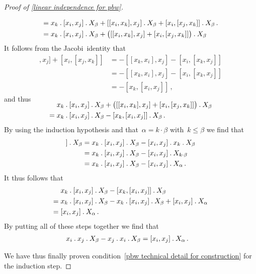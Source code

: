 \begin{proof}[Proof of \cref{linear independence for pbw}]
\begin{casedistinction}
\begin{align*}
				={}&
				x_k \mathbin{.} [x_i, x_j] \mathbin{.} X_\beta
				+ [[x_i, x_k], x_j] \mathbin{.} X_\beta
				+ [x_i, [x_j, x_k]] \mathbin{.} X_\beta \,.
				\\
				={}&
				x_k \mathbin{.} [x_i, x_j] \mathbin{.} X_\beta
				+ \bigl( [[x_i, x_k], x_j] + [x_i, [x_j, x_k]] \bigr) \mathbin{.} X_\beta
			\end{align*}
			It follows from the Jacobi~identity that
			\begin{align*}
				[[x_i, x_k], x_j] + [x_i, [x_j, x_k]]
				&=
				- [[x_k, x_i], x_j] - [x_i, [x_k, x_j]]
				\\
				&=
				- [[x_k, x_i], x_j] - [x_i, [x_k, x_j]]
				\\
				&=
				- [x_k, [x_i, x_j]] \,,
			\end{align*}
			and thus
			\begin{align*}
				\SwapAboveDisplaySkip
				{}&
				x_k \act [x_i, x_j] \act X_\beta
				+ \bigl( [[x_i, x_k], x_j] + [x_i, [x_j, x_k]] \bigr) \act X_\beta
				\\
				={}&
				x_k \act [x_i, x_j] \act X_\beta
				- [x_k, [x_i, x_j] ] \act X_\beta \,.
			\end{align*}
			By using the induction hypothesis and that~$\alpha = k \cdot \beta$ with~$k \leq \beta$ we find that
			\begin{align*}
				[x_k, [x_i, x_j]] \act X_\beta
				&=
				x_k \act [x_i, x_j] \act X_\beta
				- [x_i, x_j] \act x_k \act X_\beta
				\\
				&=
				x_k \act [x_i, x_j] \act X_\beta
				- [x_i, x_j] \act X_{k \cdot \beta}
				\\
				&=
				x_k \act [x_i, x_j] \act X_\beta
				- [x_i, x_j] \act X_{\alpha} \,.
			\end{align*}
			It thus follows that
			\begin{align*}
				{}&
				x_k \mathbin{.} [x_i, x_j] \mathbin{.} X_\beta
				- [x_k, [x_i, x_j] ] \mathbin{.} X_\beta
				\\
				={}&
				x_k \mathbin{.} [x_i, x_j] \mathbin{.} X_\beta
				- x_k \mathbin{.} [x_i, x_j] \mathbin{.} X_\beta
				+ [x_i, x_j] \mathbin{.} X_{\alpha}
				\\
				={}&
				[x_i, x_j] \mathbin{.} X_{\alpha} \,.
			\end{align*}
			By putting all of these steps together we find that
			\begin{align*}
				x_i \mathbin{.} x_j \mathbin{.} X_\beta
				- x_j \mathbin{.} x_i \mathbin{.} X_\beta
				&=
				[x_i, x_j] \mathbin{.} X_{\alpha} \,.
			\end{align*}
	\end{casedistinction}
	We have thus finally proven condition~\ref{pbw technical detail for construction} for the induction step.


\end{proof}
